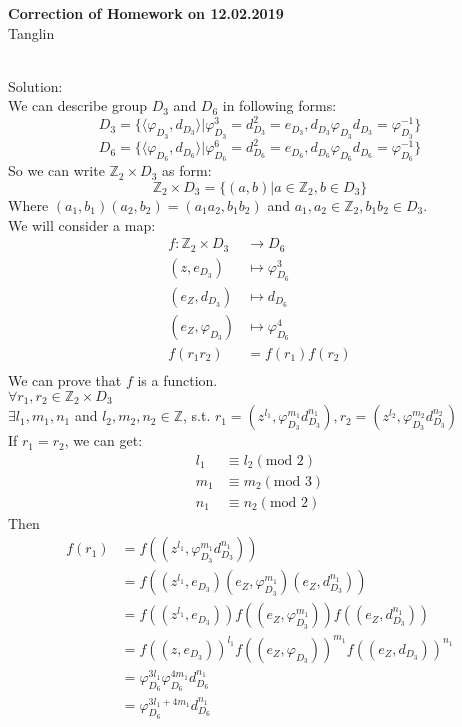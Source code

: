 \documentclass[12pt]{article}
\theoremstyle{neosn}
\begin{document}
    \begin{center}
        {\bf Correction of Homework on 12.02.2019}\\
        Tanglin
    \end{center}


    \\
    Solution:\\
    We can describe group $D_3$ and $D_6$ in following forms:
    \[
        D_3 = \{\langle \varphi_{D_3},d_{D_3} \rangle| \varphi_{D_3}^3=d_{D_3}^2=e_{D_3},d_{D_3}\varphi_{D_3}d_{D_3}=\varphi_{D_3}^{-1}\}
        \]
    \[
        D_6 = \{\langle \varphi_{D_6},d_{D_6} \rangle| \varphi_{D_6}^6=d_{D_6}^2=e_{D_6},d_{D_6}\varphi_{D_6}d_{D_6}=\varphi_{D_6}^{-1}\}
        \]
    So we can write $\mathbb{Z}_2\times D_3$ as form:
    \[
        \mathbb{Z}_2\times D_3 = \{(a,b)|a \in \mathbb{Z}_2,b\in D_3\}
        \]
    Where $(a_1,b_1)(a_2,b_2)=(a_1a_2,b_1b_2)$ and $a_1,a_2  \in \mathbb{Z}_2,b_1b_2 \in D_3$.\\
    We will consider a map:
    \begin{align*}
        f:\mathbb{Z}_2 \times D_3 &\to D_6\\
        (z,e_{D_3}) &\longmapsto \varphi_{D_6}^3\\
        (e_Z,d_{D_3}) &\longmapsto d_{D_6}\\
        (e_Z,\varphi_{D_3}) &\longmapsto \varphi_{D_6}^{4}\\
        f(r_1r_2) &= f(r_1)f(r_2)\\
    \end{align*}
    We can prove that $f$ is a function.\\
    $\forall r_1,r_2 \in \mathbb{Z}_2\times D_3$\\
    $\exists l_1,m_1,n_1$ and $l_2,m_2,n_2 \in \mathbb{Z}$, s.t. $r_1 = (z^{l_1},\varphi_{D_3}^{m_1}d_{D_3}^{n_1}),r_2 = (z^{l_2},\varphi_{D_3}^{m_2}d_{D_3}^{n_2})$\\
    If $r_1 = r_2$, we can get:
    \begin{align}
        l_1 &\equiv l_2 (\text{mod 2})\\
        m_1 &\equiv m_2 (\text{mod 3})\\
        n_1 &\equiv n_2 (\text{mod 2})
    \end{align}
    Then
    \begin{align*}
        f(r_1) &= f((z^{l_1},\varphi_{D_3}^{m_1}d_{D_3}^{n_1}))\\
                &= f((z^{l_1},e_{D_3})(e_Z,\varphi_{D_3}^{m_1})(e_Z,d_{D_3}^{n_1}))\\
                &= f((z^{l_1},e_{D_3}))f((e_Z,\varphi_{D_3}^{m_1}))f((e_Z,d_{D_3}^{n_1}))\\
                &= f((z,e_{D_3}))^{l_1}f((e_Z,\varphi_{D_3}))^{m_1}f((e_Z,d_{D_3}))^{n_1}\\
                &= \varphi_{D_6}^{3l_1} \varphi_{D_6}^{4m_1}d_{D_6}^{n_1}\\
                &= \varphi_{D_6}^{3l_1+4m_1}d_{D_6}^{n_1}
    \end{align*}
\end{document}
